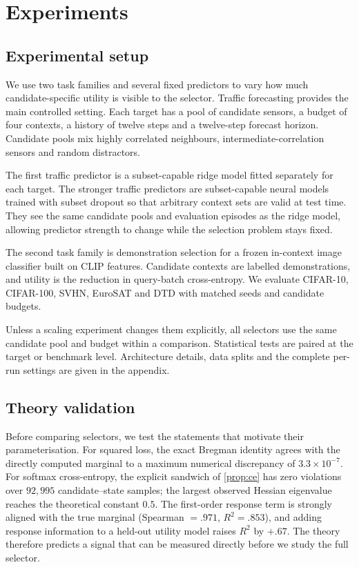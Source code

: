 \section{Experiments}
\label{sec:experiments}

\subsection{Experimental setup}

We use two task families and several fixed predictors to vary how much
candidate-specific utility is visible to the selector. Traffic forecasting
provides the main controlled setting. Each target has a pool of candidate
sensors, a budget of four contexts, a history of twelve steps and a twelve-step
forecast horizon. Candidate pools mix highly correlated neighbours,
intermediate-correlation sensors and random distractors.

The first traffic predictor is a subset-capable ridge model fitted separately
for each target. The stronger traffic predictors are subset-capable neural
models trained with subset dropout so that arbitrary context sets are valid at
test time. They see the same candidate pools and evaluation episodes as the
ridge model, allowing predictor strength to change while the selection problem
stays fixed.

The second task family is demonstration selection for a frozen in-context image
classifier built on CLIP features. Candidate contexts are labelled
demonstrations, and utility is the reduction in query-batch cross-entropy. We
evaluate CIFAR-10, CIFAR-100, SVHN, EuroSAT and DTD with matched seeds and
candidate budgets.

Unless a scaling experiment changes them explicitly, all selectors use the same
candidate pool and budget within a comparison. Statistical tests are paired at
the target or benchmark level. Architecture details, data splits and the
complete per-run settings are given in the appendix.

\subsection{Theory validation}

Before comparing selectors, we test the statements that motivate their
parameterisation. For squared loss, the exact Bregman identity agrees with the
directly computed marginal to a maximum numerical discrepancy of
$3.3\times10^{-7}$. For softmax cross-entropy, the explicit sandwich of
\cref{prop:ce} has zero violations over $92{,}995$ candidate--state samples; the
largest observed Hessian eigenvalue reaches the theoretical constant $0.5$.
The first-order response term is strongly aligned with the true marginal
(Spearman $=.971$, $R^2=.853$), and adding response information to a held-out
utility model raises $R^2$ by $+.67$. The theory therefore predicts a signal
that can be measured directly before we study the full selector.

